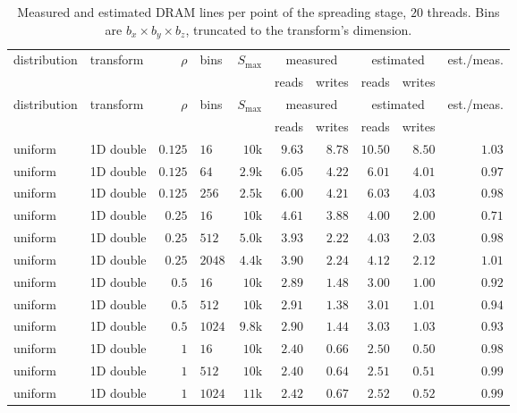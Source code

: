 {\scriptsize
\setlength{\tabcolsep}{4pt}
\begin{longtable}{llrlrrrrrr}
    \caption{Measured and estimated DRAM lines per point of the spreading stage, $20$ threads. Bins are $b_x \times b_y \times b_z$, truncated to the transform's dimension.}
    \label{tab:app_traffic} \\
    \toprule
    distribution & transform & $\rho$ & bins & $S_{\max}$ & \multicolumn{2}{c}{measured} & \multicolumn{2}{c}{estimated} & est./meas. \\
    & & & & & reads & writes & reads & writes & \\
    \midrule
    \endfirsthead
    \toprule
    distribution & transform & $\rho$ & bins & $S_{\max}$ & \multicolumn{2}{c}{measured} & \multicolumn{2}{c}{estimated} & est./meas. \\
    & & & & & reads & writes & reads & writes & \\
    \midrule
    \endhead
    \bottomrule
    \endfoot
    uniform & 1D double & $0.125$ & $16$ & $10$k & $9.63$ & $8.78$ & $10.50$ & $8.50$ & $1.03$ \\
    uniform & 1D double & $0.125$ & $64$ & $2.9$k & $6.05$ & $4.22$ & $6.01$ & $4.01$ & $0.97$ \\
    uniform & 1D double & $0.125$ & $256$ & $2.5$k & $6.00$ & $4.21$ & $6.03$ & $4.03$ & $0.98$ \\
    uniform & 1D double & $0.25$ & $16$ & $10$k & $4.61$ & $3.88$ & $4.00$ & $2.00$ & $0.71$ \\
    uniform & 1D double & $0.25$ & $512$ & $5.0$k & $3.93$ & $2.22$ & $4.03$ & $2.03$ & $0.98$ \\
    uniform & 1D double & $0.25$ & $2048$ & $4.4$k & $3.90$ & $2.24$ & $4.12$ & $2.12$ & $1.01$ \\
    uniform & 1D double & $0.5$ & $16$ & $10$k & $2.89$ & $1.48$ & $3.00$ & $1.00$ & $0.92$ \\
    uniform & 1D double & $0.5$ & $512$ & $10$k & $2.91$ & $1.38$ & $3.01$ & $1.01$ & $0.94$ \\
    uniform & 1D double & $0.5$ & $1024$ & $9.8$k & $2.90$ & $1.44$ & $3.03$ & $1.03$ & $0.93$ \\
    uniform & 1D double & $1$ & $16$ & $10$k & $2.40$ & $0.66$ & $2.50$ & $0.50$ & $0.98$ \\
    uniform & 1D double & $1$ & $512$ & $10$k & $2.40$ & $0.64$ & $2.51$ & $0.51$ & $0.99$ \\
    uniform & 1D double & $1$ & $1024$ & $11$k & $2.42$ & $0.67$ & $2.52$ & $0.52$ & $0.99$ \\

\end{longtable}}

